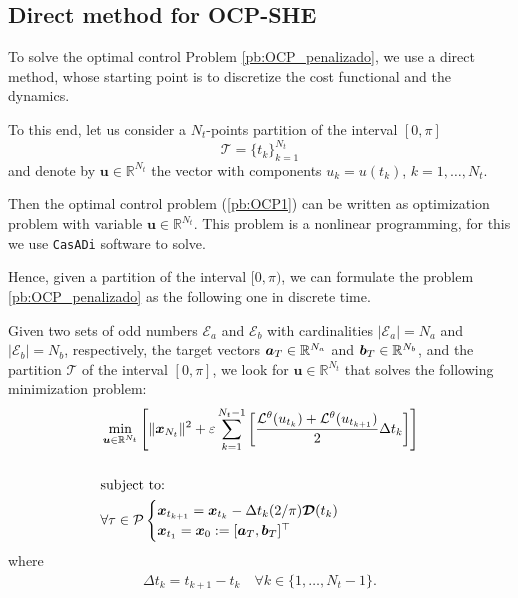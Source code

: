 \documentclass[twocolumn]{autart}    %
\begin{document}
\subsection{Direct method  for OCP-SHE}

To solve the optimal control Problem \ref{pb:OCP_penalizado}, we use a direct method, whose starting point is to discretize the cost functional and the dynamics.

To this end, let us consider a $N_t$-points partition of the interval $[0,\pi]$ 
\begin{displaymath} 
	\mathcal{T} = \{t_k\}_{k=1}^{N_t} 
\end{displaymath}
and denote by $\bm{u} \in \mathbb{R}^{N_t}$ the vector with components $u_k = u(t_k)$, $k=1,\ldots,N_t$.

Then the optimal control problem (\ref{pb:OCP1}) can be written as optimization problem with variable $\bm{u} \in \mathbb{R}^{N_t}$. This problem is a nonlinear programming, for this we use \texttt{CasADi} software to solve. 

Hence, given a partition of the interval $[0,\pi)$, we can formulate the problem \ref{pb:OCP_penalizado} as the following one in discrete time.
\newline

\begin{problem}\label{pb:numOCP2}
Given two sets of odd numbers $\mathcal{E}_a$ and $\mathcal{E}_b$ with cardinalities $|\mathcal{E}_a| = N_a$ and $|\mathcal{E}_b| = N_b$, respectively, the target vectors $\bm{a}_T \in \mathbb{R}^{N_a}$ and $\bm{b}_T \in \mathbb{R}^{N_b}$, and the partition $\mathcal{T}$ of the interval $[0,\pi]$, we look for $\bm{u} \in \mathbb{R}^{N_t}$ that solves the following minimization problem:
\begin{align*}
	&\min_{\bm{u} \in \mathbb{R}^{N_t}} \Bigg[\| \bm{x}_{N_t}\|^2 + \varepsilon \sum_{k=1}^{N_t-1} 
	\bigg[\frac{\mathcal{L}^\theta(u_{t_k}) + \mathcal{L}^\theta(u_{t_{k+1}})}{2}\Delta t_k \bigg]  \Bigg]  
	\\[15pt]
    &\notag \text{subject to: } 
    \\
    &\forall \tau \in \mathcal{P} \begin{cases}
    \bm{x}_{t_{k+1}} = \bm{x}_{t_k} - \Delta t_{k} (2/\pi) \bm{\mathcal{D}}(t_k)\\
    \bm{x}_{t_1} = \bm{x}_0:= [\bm{a}_T,\bm{b}_T]^\top
    \end{cases} 
\end{align*}
where 
\begin{gather}
	\Delta t_{k} = t_{k+1} - t_{k} \hspace{1em} \forall k \in \{1,\dots,N_t-1\}.
\end{gather}
\end{problem}
\end{document}
